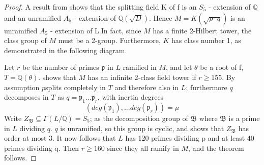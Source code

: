 \documentclass[12pt]{extarticle}
\newcommand{\Q}{\mathbb{Q}}
\newcommand{\<}{\langle}
\renewcommand{\>}{\rangle}
\theoremstyle{definition}
\begin{document}
\begin{proof}
A result from \cite{KOND} shows that the splitting field K
of f is an $S_5$ - extension of $\Q$ and an unramified $A_5$ - extension of $\Q(\sqrt{D})$. Hence $M=K\left(\sqrt{p \cdot q}\right)$ is an
unramified $A_5$ - extension of L.In fact, since $M$ has a finite 2-Hilbert tower, the class group of $M$ must be a 2-group.  Furthermore, $K$ has class number 1, as demonstrated in the following diagram.
\begin{center}
\end{center}

Let $r$ be the number of primes $\mathfrak{p}$ in $L$ ramified in $M$, and let $\theta$ be a root of f, $T = \Q(\theta)$. \cite{MART1978} shows that $M$ has an infinite 2-class field tower if $r\geq 155$. By assumption $p$splits completely in $T$ and therefore also in $L$; furthermore $q$ decomposes in $T$ as $q = \mathfrak{p}_1...\mathfrak{p}_r$, with inertia degrees
\begin{equation}
    (deg(\mathfrak{p}_1),...deg(\mathfrak{p}_r))=\mu 
\end{equation}
Write $Z_\mathfrak{B}\subseteq\Gamma(L/\Q) = S_5$; as the decomposition group of $\mathfrak{B}$ where $\mathfrak{B}$ is a prime in $L$ dividing $q$. $q$ is unramified, so this group is cyclic, and \cite{MART1978} shows that $Z_\mathfrak{B}$ has order at most 3.  It now follows that $L$ has 120 primes dividing p and at least 40 primes dividing q. Then $r\geq 160$ since they all ramify in $M$, and the theorem follows.
\end{proof}
\end{document}

